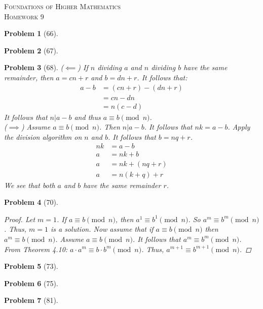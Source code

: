 \documentclass{article}
\theoremstyle{problem}
\newtheorem{prob}{Problem}
\theoremstyle{plain}
\theoremstyle{remark}
\begin{document}
\begin{center}
\textsc{\Large Foundations of Higher Mathematics}\\[.3cm]
\textsc{\Large Homework 9}
\end{center}

\begin{prob}[66]


\end{prob}
%

\begin{prob}[67]

\end{prob}
%

\begin{prob}[68]
($\impliedby$) If $n$ dividing $a$ and $n$ dividing $b$ have the same remainder, then $a = cn + r$ and $b = dn + r$. It follows that:
\begin{align*}
  a - b &= (cn + r) - (dn + r)\\
  &= cn - dn\\
  &= n(c -d)
\end{align*}
It follows that $n\big | a - b$ and thus $a \equiv b \pmod{n}$.\\

($\implies$) Assume $a \equiv b \pmod{n}$. Then $n \big | a - b$. It follows that $nk = a - b$. Apply the division algorithm on $n$ and $b$. It follows that $b = nq + r$.
\begin{align*}
  nk &= a - b\\
  a &= nk + b\\
  a &= nk + (nq + r)\\
  a &= n(k+q) + r
\end{align*}
We see that both $a$ and $b$ have the same remainder $r$.
\end{prob}
%

\begin{prob}[70]\ \\[-1cm]
  \begin{proof}
    Let $m = 1$. If $a \equiv b \pmod{n}$, then $a^1 \equiv b^1 \pmod{n}$. So $a^m \equiv b^m \pmod{n}$. Thus, $m = 1$ is a solution. Now assume that if $a \equiv b \pmod{n}$ then $a^m \equiv b \pmod{n}$. Assume $a \equiv b \pmod{n}$. It follows that $a^m \equiv b^m \pmod{n}$. From Theorem 4.10: $a \cdot a^m \equiv b \cdot b^m \pmod{n}$. Thus, $a^{m+1} \equiv b^{m+1} \pmod{n}$.
  \end{proof}
\end{prob}
% 

\begin{prob}[73]

\end{prob}
%

\begin{prob}[75]

\end{prob}
%

\begin{prob}[81]

\end{prob}
%
\end{document}
